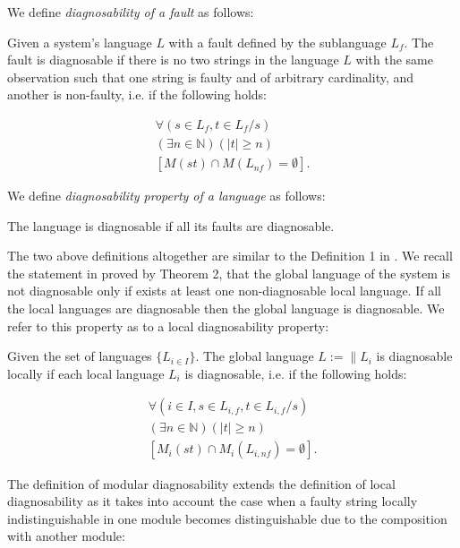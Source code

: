 We define \emph{diagnosability of a fault} as follows:
\begin{definition} 
\label{def:fault_is_diag}
Given a system's language $L$ with a fault defined by the sublanguage $L_f$. The
fault is diagnosable if there is no two strings in the language $L$ with the
same observation such that one string is faulty and of arbitrary cardinality,
and another is non-faulty, i.e. if the following holds:
\end{definition}
\begin{equation}
\begin{array}{l}
	\forall(s \in L_f, t \in L_f/s) 
	\\
	(\exists n \in \mathbb{N})
	(|t| \geq n) 
	\\
	\left[ M(st) \cap M(L_{nf}) = \emptyset \right].
\end{array}
\end{equation}

We define \emph{diagnosability property of a language} as follows:
\begin{definition}
The language is diagnosable if all its faults are diagnosable.
\end{definition}
The two above definitions altogether are similar to the Definition 1 in
\cite{sampath_diagnosability_1995}. We recall the statement in
\cite{contant_diagnosability_2006} proved by Theorem 2, that the global
language of the system is not diagnosable only if exists at least one non-diagnosable
local language. If all the local languages are diagnosable then the global
language is diagnosable. We refer to this property as to a local diagnosability
property:

\begin{definition} Given the set of languages
$\{L_{i \in I}\}$. The global language $L := \parallel L_i$ is
diagnosable locally if each local language $L_i$ is diagnosable, i.e. if
the following holds:
\end{definition}
\begin{equation}
\begin{array}{l}
	\forall(i \in I, s \in L_{i,f}, t \in L_{i,f}/s)
	\\
	(\exists n \in \mathbb{N})
	(|t| \geq n)
	\\
	\left[ M_i(st) \cap M_i(L_{i,nf}) = \emptyset \right].
\end{array}
\end{equation}

The definition of modular diagnosability extends the definition of local
diagnosability as it takes into account the case when a faulty string locally
indistinguishable in one module becomes distinguishable due to the
composition with another module:

